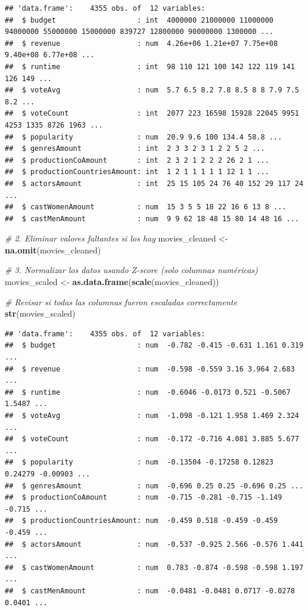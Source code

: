 \documentclass[
]{article}
\newenvironment{Shaded}{\begin{snugshade}}{\end{snugshade}}
\newcommand{\CommentTok}[1]{\textcolor[rgb]{0.56,0.35,0.01}{\textit{#1}}}
\newcommand{\FunctionTok}[1]{\textcolor[rgb]{0.13,0.29,0.53}{\textbf{#1}}}
\newcommand{\NormalTok}[1]{#1}
\newcommand{\OtherTok}[1]{\textcolor[rgb]{0.56,0.35,0.01}{#1}}
\begin{document}
\begin{verbatim}
## 'data.frame':    4355 obs. of  12 variables:
##  $ budget                   : int  4000000 21000000 11000000 94000000 55000000 15000000 839727 12800000 90000000 1300000 ...
##  $ revenue                  : num  4.26e+06 1.21e+07 7.75e+08 9.40e+08 6.77e+08 ...
##  $ runtime                  : int  98 110 121 100 142 122 119 141 126 149 ...
##  $ voteAvg                  : num  5.7 6.5 8.2 7.8 8.5 8 8 7.9 7.5 8.2 ...
##  $ voteCount                : int  2077 223 16598 15928 22045 9951 4253 1335 8726 1963 ...
##  $ popularity               : num  20.9 9.6 100 134.4 58.8 ...
##  $ genresAmount             : int  2 3 3 2 3 1 2 2 5 2 ...
##  $ productionCoAmount       : int  2 3 2 1 2 2 2 26 2 1 ...
##  $ productionCountriesAmount: int  1 2 1 1 1 1 1 12 1 1 ...
##  $ actorsAmount             : int  25 15 105 24 76 40 152 29 117 24 ...
##  $ castWomenAmount          : num  15 3 5 5 18 22 16 6 13 8 ...
##  $ castMenAmount            : num  9 9 62 18 48 15 80 14 48 16 ...
\end{verbatim}

\begin{Shaded}
\begin{Highlighting}[]
\CommentTok{\# 2. Eliminar valores faltantes si los hay}
\NormalTok{movies\_cleaned }\OtherTok{\textless{}{-}} \FunctionTok{na.omit}\NormalTok{(movies\_cleaned)}

\CommentTok{\# 3. Normalizar los datos usando Z{-}score (solo columnas numéricas)}
\NormalTok{movies\_scaled }\OtherTok{\textless{}{-}} \FunctionTok{as.data.frame}\NormalTok{(}\FunctionTok{scale}\NormalTok{(movies\_cleaned))}

\CommentTok{\# Revisar si todas las columnas fueron escaladas correctamente}
\FunctionTok{str}\NormalTok{(movies\_scaled)  }
\end{Highlighting}
\end{Shaded}

\begin{verbatim}
## 'data.frame':    4355 obs. of  12 variables:
##  $ budget                   : num  -0.782 -0.415 -0.631 1.161 0.319 ...
##  $ revenue                  : num  -0.598 -0.559 3.16 3.964 2.683 ...
##  $ runtime                  : num  -0.6046 -0.0173 0.521 -0.5067 1.5487 ...
##  $ voteAvg                  : num  -1.098 -0.121 1.958 1.469 2.324 ...
##  $ voteCount                : num  -0.172 -0.716 4.081 3.885 5.677 ...
##  $ popularity               : num  -0.13504 -0.17258 0.12823 0.24279 -0.00903 ...
##  $ genresAmount             : num  -0.696 0.25 0.25 -0.696 0.25 ...
##  $ productionCoAmount       : num  -0.715 -0.281 -0.715 -1.149 -0.715 ...
##  $ productionCountriesAmount: num  -0.459 0.518 -0.459 -0.459 -0.459 ...
##  $ actorsAmount             : num  -0.537 -0.925 2.566 -0.576 1.441 ...
##  $ castWomenAmount          : num  0.783 -0.874 -0.598 -0.598 1.197 ...
##  $ castMenAmount            : num  -0.0481 -0.0481 0.0717 -0.0278 0.0401 ...
\end{verbatim}
\end{document}
